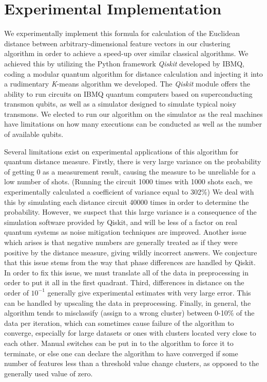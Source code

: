 \documentclass[twocolumn, english]{revtex4-2}
\begin{document}
\section{Experimental Implementation}
We experimentally implement this formula for calculation of the Euclidean distance between arbitrary-dimensional feature vectors in our clustering algorithm in order to achieve a speed-up over similar classical algorithms. We achieved this by utilizing the Python framework \textit{Qiskit} developed by IBMQ, coding a modular quantum algorithm for distance calculation and injecting it into a rudimentary \textit{K}-means algorithm we developed. The \textit{Qiskit} module offers the ability to run circuits on IBMQ quantum computers based on superconducting transmon qubits, as well as a simulator designed to simulate typical noisy transmons. We elected to run our algorithm on the simulator as the real machines have limitations on how many executions can be conducted as well as the number of available qubits. 

Several limitations exist on experimental applications of this algorithm for quantum distance measure. Firstly, there is very large variance on the probability of getting 0 as a measurement result, causing the measure to be unreliable for a low number of shots. (Running the circuit 1000 times with 1000 shots each, we experimentally calculated a coefficient of variance equal to 302\%) We deal with this by simulating each distance circuit 40000 times in order to determine the probability. However, we suspect that this large variance is a consequence of the simulation software provided by Qiskit, and will be less of a factor on real quantum systems as noise mitigation techniques are improved. Another issue which arises is that negative numbers are generally treated as if they were positive by the distance measure, giving wildly incorrect answers. We conjecture that this issue stems from the way that phase differences are handled by Qiskit. In order to fix this issue, we must translate all of the data in preprocessing in order to put it all in the first quadrant. Third, differences in distance on the order of $10^{-1}$ generally give experimental estimates with very large error. This can be handled by upscaling the data in preprocessing. Finally, in general, the algorithm tends to misclassify (assign to a wrong cluster) between 0-10\% of the data per iteration, which can sometimes cause failure of the algorithm to converge, especially for large datasets or ones with clusters located very close to each other. Manual switches can be put in to the algorithm to force it to terminate, or else one can declare the algorithm to have converged if some number of features less than a threshold value change clusters, as opposed to the generally used value of zero.
\end{document}
